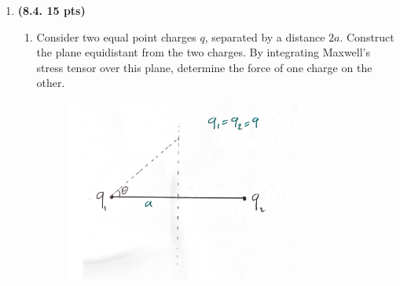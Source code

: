 \documentclass[fleqn]{article}
\begin{document}
\begin{enumerate}

    \pagebreak

    \item \textbf{(8.4. 15 pts)}
    \begin{enumerate}
      \item Consider two equal point charges $q$, separated by a distance $2a$. Construct the
      plane equidistant from the two charges. By integrating Maxwell’s stress tensor
      over this plane, determine the force of one charge on the other.

        \begin{center}
          \includegraphics[height=6cm, width=10cm]{problem8.14.JPG}
        \end{center}


\end{enumerate}
\end{enumerate}
\end{document}
